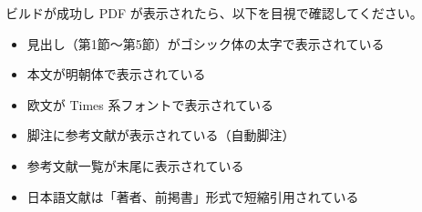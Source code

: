 \documentclass[a4paper,11pt,oneside]{jlreq}
\begin{document}
ビルドが成功し PDF が表示されたら、以下を目視で確認してください。

\begin{itemize}
  \item[$\circ$] 見出し（第1節〜第5節）がゴシック体の太字で表示されている
  \item[$\circ$] 本文が明朝体で表示されている
  \item[$\circ$] 欧文が Times 系フォントで表示されている
  \item[$\circ$] 脚注に参考文献が表示されている（自動脚注）
  \item[$\circ$] 参考文献一覧が末尾に表示されている
  \item[$\circ$] 日本語文献は「著者、前掲書」形式で短縮引用されている
\end{itemize}

\printbibliography[title={参考文献}]
\end{document}
